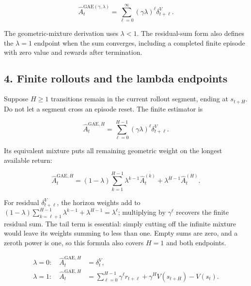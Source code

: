 \documentclass[11pt, a4paper]{article}
\begin{document}
\begin{equation}\label{eq:ppo-gae-residual-sum}
    \boxed{\hat A_t^{\mathrm{GAE}(\gamma,\lambda)}
    =\sum_{\ell=0}^{\infty}(\gamma\lambda)^\ell\delta_{t+\ell}^V.}
\end{equation}

The geometric-mixture derivation uses $\lambda<1$. The residual-sum form also defines the $\lambda=1$ endpoint when the sum converges, including a completed finite episode with zero value and rewards after termination.

\subsection*{4. Finite rollouts and the lambda endpoints}

Suppose $H\ge1$ transitions remain in the current rollout segment, ending at $s_{t+H}$. Do not let a segment cross an episode reset. The finite estimator is

\begin{equation}\label{eq:ppo-gae-finite-sum}
    \hat A_t^{\mathrm{GAE},H}
    =\sum_{\ell=0}^{H-1}(\gamma\lambda)^\ell\delta_{t+\ell}^V.
\end{equation}

Its equivalent mixture puts all remaining geometric weight on the longest available return:

\begin{equation}\label{eq:ppo-gae-finite-mixture}
    \hat A_t^{\mathrm{GAE},H}
    =(1-\lambda)\sum_{k=1}^{H-1}\lambda^{k-1}\hat A_t^{(k)}
      +\lambda^{H-1}\hat A_t^{(H)}.
\end{equation}

For residual $\delta_{t+\ell}^V$, the horizon weights add to $(1-\lambda)\sum_{k=\ell+1}^{H-1}\lambda^{k-1}+\lambda^{H-1}=\lambda^\ell$; multiplying by $\gamma^\ell$ recovers the finite residual sum. The tail term is essential: simply cutting off the infinite mixture would leave its weights summing to less than one. Empty sums are zero, and a zeroth power is one, so this formula also covers $H=1$ and both endpoints.

\begin{align}
    \lambda=0:\quad\hat A_t^{\mathrm{GAE},H}
    &=\delta_t^V,\label{eq:ppo-gae-lambda-zero}\\
    \lambda=1:\quad\hat A_t^{\mathrm{GAE},H}
    &=\sum_{\ell=0}^{H-1}\gamma^\ell r_{t+\ell}
      +\gamma^HV(s_{t+H})-V(s_t).\label{eq:ppo-gae-lambda-one}
\end{align}
\end{document}
